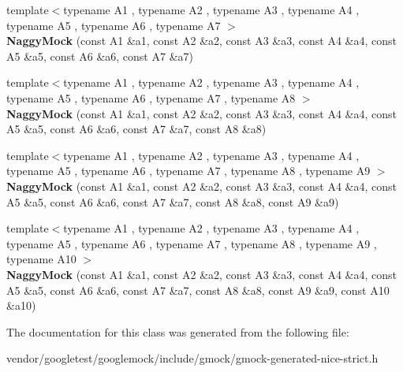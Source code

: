 \begin{DoxyCompactItemize}
\item 
{\footnotesize template$<$typename A1 , typename A2 , typename A3 , typename A4 , typename A5 , typename A6 , typename A7 $>$ }\\{\bfseries Naggy\+Mock} (const A1 \&a1, const A2 \&a2, const A3 \&a3, const A4 \&a4, const A5 \&a5, const A6 \&a6, const A7 \&a7)\hypertarget{classtesting_1_1NaggyMock_ad1edac1991dd20514e822c90d6896c74}{}\label{classtesting_1_1NaggyMock_ad1edac1991dd20514e822c90d6896c74}

\item 
{\footnotesize template$<$typename A1 , typename A2 , typename A3 , typename A4 , typename A5 , typename A6 , typename A7 , typename A8 $>$ }\\{\bfseries Naggy\+Mock} (const A1 \&a1, const A2 \&a2, const A3 \&a3, const A4 \&a4, const A5 \&a5, const A6 \&a6, const A7 \&a7, const A8 \&a8)\hypertarget{classtesting_1_1NaggyMock_a63b30506f56b792ffbdc5792a9630d5e}{}\label{classtesting_1_1NaggyMock_a63b30506f56b792ffbdc5792a9630d5e}

\item 
{\footnotesize template$<$typename A1 , typename A2 , typename A3 , typename A4 , typename A5 , typename A6 , typename A7 , typename A8 , typename A9 $>$ }\\{\bfseries Naggy\+Mock} (const A1 \&a1, const A2 \&a2, const A3 \&a3, const A4 \&a4, const A5 \&a5, const A6 \&a6, const A7 \&a7, const A8 \&a8, const A9 \&a9)\hypertarget{classtesting_1_1NaggyMock_a786f31ade7b8b9f6e78e07f51cc0e14b}{}\label{classtesting_1_1NaggyMock_a786f31ade7b8b9f6e78e07f51cc0e14b}

\item 
{\footnotesize template$<$typename A1 , typename A2 , typename A3 , typename A4 , typename A5 , typename A6 , typename A7 , typename A8 , typename A9 , typename A10 $>$ }\\{\bfseries Naggy\+Mock} (const A1 \&a1, const A2 \&a2, const A3 \&a3, const A4 \&a4, const A5 \&a5, const A6 \&a6, const A7 \&a7, const A8 \&a8, const A9 \&a9, const A10 \&a10)\hypertarget{classtesting_1_1NaggyMock_aa40a39806b939f423696f9380de3172b}{}\label{classtesting_1_1NaggyMock_aa40a39806b939f423696f9380de3172b}

\end{DoxyCompactItemize}


The documentation for this class was generated from the following file\+:\begin{DoxyCompactItemize}
\item 
vendor/googletest/googlemock/include/gmock/gmock-\/generated-\/nice-\/strict.\+h\end{DoxyCompactItemize}
